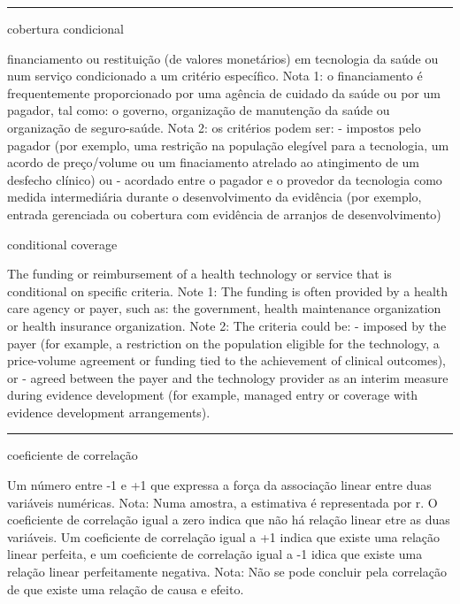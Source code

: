 \documentclass[
]{book}
\begin{document}
\begin{center}\rule{0.5\linewidth}{0.5pt}\end{center}

cobertura condicional

financiamento ou restituição (de valores monetários) em tecnologia da saúde ou num serviço condicionado a um critério específico. Nota 1: o financiamento é frequentemente proporcionado por uma agência de cuidado da saúde ou por um pagador, tal como: o governo, organização de manutenção da saúde ou organização de seguro-saúde. Nota 2: os critérios podem ser: - impostos pelo pagador (por exemplo, uma restrição na população elegível para a tecnologia, um acordo de preço/volume ou um finaciamento atrelado ao atingimento de um desfecho clínico) ou - acordado entre o pagador e o provedor da tecnologia como medida intermediária durante o desenvolvimento da evidência (por exemplo, entrada gerenciada ou cobertura com evidência de arranjos de desenvolvimento)

conditional coverage

The funding or reimbursement of a health technology or service that is conditional on specific criteria. Note 1: The funding is often provided by a health care agency or payer, such as: the government, health maintenance organization or health insurance organization. Note 2: The criteria could be:
- imposed by the payer (for example, a restriction on the population eligible for the technology, a price-volume agreement or funding tied to the achievement of clinical outcomes), or
- agreed between the payer and the technology provider as an interim measure during evidence development (for example, managed entry or coverage with evidence development arrangements).

\begin{center}\rule{0.5\linewidth}{0.5pt}\end{center}

coeficiente de correlação

Um número entre -1 e +1 que expressa a força da associação linear entre duas variáveis numéricas. Nota: Numa amostra, a estimativa é representada por r. O coeficiente de correlação igual a zero indica que não há relação linear etre as duas variáveis. Um coeficiente de correlação igual a +1 indica que existe uma relação linear perfeita, e um coeficiente de correlação igual a -1 idica que existe uma relação linear perfeitamente negativa. Nota: Não se pode concluir pela correlação de que existe uma relação de causa e efeito.
\end{document}

